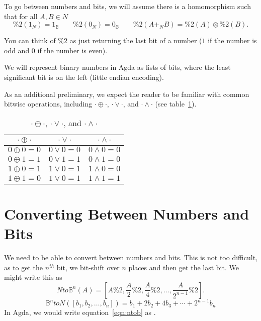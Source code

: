 \documentclass[14pt]{extarticle}  %
\begin{document}

To go between numbers and bits, we will assume there is a homomorphism
\rnc{}
such that for all $A,B \in N$
\[ \%2(1_{N}) = 1_{\mathbb{B}} \qquad \%2(0_{N}) = 0_{\mathbb{B}} \qquad \%2(A +_{N} B) = \%2(A) \otimes \%2(B).\]

You can think of $\%2$ as just returning the last bit of a number ($1$ if the number is odd and $0$ if the number is even).

We will represent binary numbers in Agda as lists of bits, where the least significant bit is on the left (little endian encoding).

As an additional preliminary, we expect the reader to be familiar with common bitwise operations, including $\cdot \oplus \cdot$, $\cdot \lor \cdot$, and $\cdot \land \cdot$ (see table~\ref{table:bitops}).
\begin{table}[!h]
\centering
\begin{tabular}{||c c c||}
 \hline
 $\cdot \oplus \cdot$ & $\cdot \lor \cdot$ & $\cdot \land \cdot$  \\ [0.5ex]
 \hline\hline
 $0 \oplus 0 = 0$ & $0 \lor 0 = 0$ & $0 \land 0 = 0$ \\
 $0 \oplus 1 = 1$ & $0 \lor 1 = 1$ & $0 \land 1 = 0$ \\
 $1 \oplus 0 = 1$ & $1 \lor 0 = 1$ & $1 \land 0 = 0$ \\
 $1 \oplus 1 = 0$ & $1 \lor 0 = 1$ & $1 \land 1 = 1$ \\
 \hline
\end{tabular}
\caption{$\cdot \oplus \cdot$, $\cdot \lor \cdot$, and $\cdot \land \cdot$}
\label{table:bitops}
\end{table}

\section{Converting Between Numbers and Bits}
We need to be able to convert between numbers and bits. This is not too difficult, as to get the $n^{th}$ bit, we bit-shift over $n$ places
and then get the last bit. We might write this as
\begin{equation}\label{eqn:ntob}
Nto\mathbb{B}^{n}(A) = [A \% 2 , \frac{A}{2} \% 2 , \frac{A}{4} \% 2 , \ldots, \frac{A}{2^{n-1}} \%2 ].
\end{equation}
\begin{equation}\label{eqn:bton}
  \mathbb{B}^{n}toN([b_{1}, b_{2}, \ldots, b_{n}]) = b_{1} + 2b_{2}+4b_{3}+\cdots+2^{n-1}b_{n}
\end{equation}
\rnc{}
In Agda, we would write equation~\ref{eqn:ntob} as .
\end{document}
